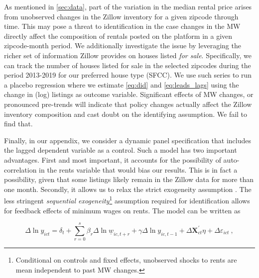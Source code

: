 
As mentioned in \autoref{sec:data}, part of the variation in the median rental price arises 
from unobserved changes in the Zillow inventory for a given zipcode through time. This may 
pose a threat to identification in the case changes in the MW directly affect the composition 
of rentals posted on the platform in a given zipcode-month period. We 
additionally investigate the issue by leveraging the richer set of information Zillow provides 
on houses listed \textit{for sale}. Specifically, we can track the number of houses listed for 
sale in the selected zipcodes during the period 2013-2019 for our preferred house type (SFCC). 
We use such series to run a placebo regression where we estimate \autoref{eq:did} and 
\autoref{eq:leads_lags} using the change in (log) listings as outcome variable. Significant 
effects of MW changes, or pronounced pre-trends will indicate that policy changes actually 
affect the Zillow inventory composition and cast doubt on the identifying assumption. We fail to find that.

Finally, in our appendix, we consider a dynamic panel specification that includes the lagged
dependent variable as a control. Such a model has two important advantages. First and most 
important, it accounts for the possibility of auto-correlation in the rents variable that 
would bias our results. This is in fact a possibility, given that some listings likely remain 
in the Zillow data for more than one month. Secondly, it allows us to relax the strict 
exogeneity assumption \parencite{ArellanoHonore2001}. The less stringent \textit{sequential 
exogeneity}\footnote{Conditional on controls and fixed effects, unobserved shocks to rents are mean independent to past MW changes.} assumption required for identification allows for feedback effects of minimum wages 
on rents. The model can be written as

\begin{equation}\label{eq:ab_panel}
	\Delta \ln y_{ict} = \delta_t
						+ \sum_{r=0}^{s} \beta_r \Delta \ln \underline{w}_{ic,t+r}
						+ \gamma \Delta \ln y_{ic,t-1} + \Delta \mathbf{X}^{'}_{ct}\eta
						+ \Delta \varepsilon_{ict} \ ,
\end{equation}

